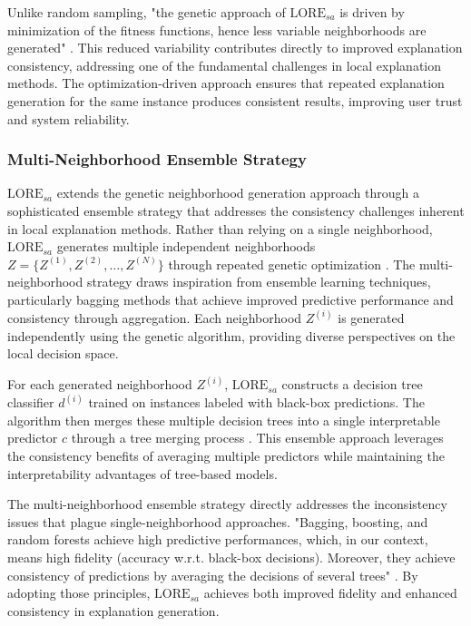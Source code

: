 Unlike random sampling, "the genetic approach of $\text{LORE}_{sa}$ is driven by minimization of the fitness functions, hence less variable neighborhoods are generated" \cite{guidotti2022stable}. This reduced variability contributes directly to improved explanation consistency, addressing one of the fundamental challenges in local explanation methods. The optimization-driven approach ensures that repeated explanation generation for the same instance produces consistent results, improving user trust and system reliability.

\subsubsection{Multi-Neighborhood Ensemble Strategy}

$\text{LORE}_{sa}$ extends the genetic neighborhood generation approach through a sophisticated ensemble strategy that addresses the consistency challenges inherent in local explanation methods. Rather than relying on a single neighborhood, $\text{LORE}_{sa}$ generates multiple independent neighborhoods $Z = \{Z^{(1)}, Z^{(2)}, \ldots, Z^{(N)}\}$ through repeated genetic optimization \cite{guidotti2022stable}.
% 
The multi-neighborhood strategy draws inspiration from ensemble learning techniques, particularly bagging methods that achieve improved predictive performance and consistency through aggregation. 
Each neighborhood $Z^{(i)}$ is generated independently using the genetic algorithm, providing diverse perspectives on the local decision space.

For each generated neighborhood $Z^{(i)}$, $\text{LORE}_{sa}$ constructs a decision tree classifier $d^{(i)}$ trained on instances labeled with black-box predictions. The algorithm then merges these multiple decision trees into a single interpretable predictor $c$ through a tree merging process \cite{guidotti2022stable}. This ensemble approach leverages the consistency benefits of averaging multiple predictors while maintaining the interpretability advantages of tree-based models.

The multi-neighborhood ensemble strategy directly addresses the inconsistency issues that plague single-neighborhood approaches. "Bagging, boosting, and random forests achieve high predictive performances, which, in our context, means high fidelity (accuracy w.r.t. black-box decisions). Moreover, they achieve consistency of predictions by averaging the decisions of several trees" \cite{guidotti2022stable}. By adopting those principles, $\text{LORE}_{sa}$ achieves both improved fidelity and enhanced consistency in explanation generation.

